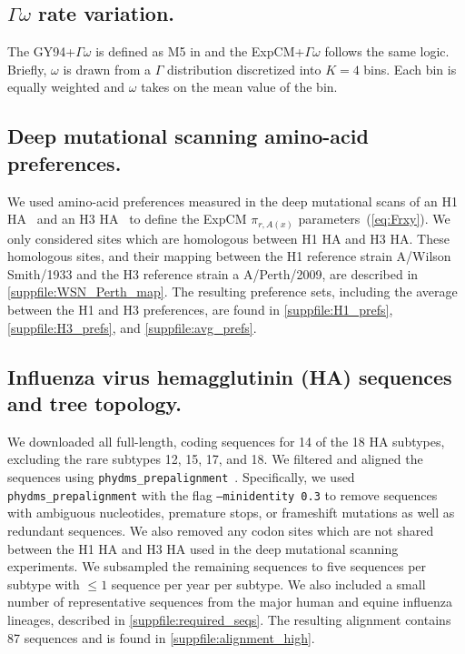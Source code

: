 \documentclass[11pt]{article}
\begin{document}
\subsection*{$\Gamma\omega$ rate variation.}

The GY94+$\Gamma\omega$ is defined as M5 in \citet{yang2000codon} and the ExpCM+$\Gamma\omega$ follows the same logic. 
Briefly, $\omega$ is drawn from a $\Gamma$ distribution discretized into $K=4$ bins. 
Each bin is equally weighted and $\omega$ takes on the mean value of the bin. 

\subsection*{Deep mutational scanning amino-acid preferences.}
We used amino-acid preferences measured in the deep mutational scans of an H1 HA~\citep{doud2016accurate} and an H3 HA~\citep{lee2018deep} to define the ExpCM $\pi_{r, A\left(x\right)}$ parameters~(\ref{eq:Frxy}). 
We only considered sites which are homologous between H1 HA and H3 HA. 
These homologous sites, and their mapping between the H1 reference strain A/Wilson Smith/1933 and the H3 reference strain a A/Perth/2009, are described in \ref{suppfile:WSN_Perth_map}. 
The resulting preference sets, including the average between the H1 and H3 preferences, are found in \ref{suppfile:H1_prefs}, \ref{suppfile:H3_prefs}, and \ref{suppfile:avg_prefs}.

\subsection*{Influenza virus hemagglutinin (HA) sequences and tree topology.}

We downloaded all full-length, coding sequences for 14 of the 18 HA subtypes, excluding the rare subtypes 12, 15, 17, and 18. 
We filtered and aligned the sequences using \texttt{phydms\_prepalignment}~\citep{hilton2017phydms}. 
Specifically, we used \texttt{phydms\_prepalignment} with the flag \texttt{--minidentity 0.3} to remove sequences with ambiguous nucleotides, premature stops, or frameshift mutations as well as redundant sequences.  
We also removed any codon sites which are not shared between the H1 HA and H3 HA used in the deep mutational scanning experiments. 
We subsampled the remaining sequences to five sequences per subtype with $\le 1$ sequence per year per subtype. 
We also included a small number of representative sequences from the major human and equine influenza lineages, described in \ref{suppfile:required_seqs}. 
The resulting alignment contains 87 sequences and is found in \ref{suppfile:alignment_high}. 
\end{document}
